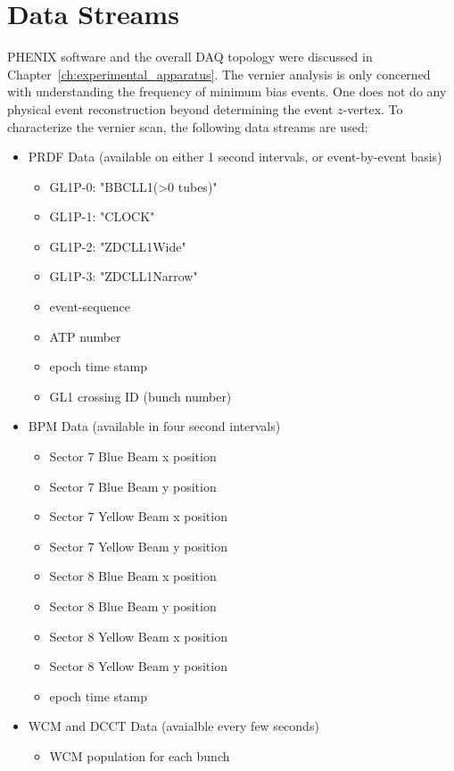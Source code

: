 
\clearpage
\section{Data Streams}
\label{ch:DataStreams}

PHENIX software and the overall DAQ topology were discussed in
Chapter~\ref{ch:experimental_apparatus}. The vernier analysis is only concerned
with understanding the frequency of minimum bias events. One does not do any
physical event reconstruction beyond determining the event $z$-vertex. To
characterize the vernier scan, the following data streams are used:

\begin{itemize}
\item PRDF Data (available on either 1 second intervals, or event-by-event basis)
  \begin{itemize}
  \item GL1P-0: "BBCLL1(\textgreater0 tubes)"
  \item GL1P-1: "CLOCK"
  \item GL1P-2: "ZDCLL1Wide"
  \item GL1P-3: "ZDCLL1Narrow"
  \item event-sequence
  \item ATP number
  \item epoch time stamp
  \item GL1 crossing ID (bunch number)
  \end{itemize}
\item BPM Data (available in four second intervals)
  \begin{itemize}
  \item Sector 7 Blue Beam x position
  \item Sector 7 Blue Beam y position
  \item Sector 7 Yellow Beam x position
  \item Sector 7 Yellow Beam y position
  \item Sector 8 Blue Beam x position
  \item Sector 8 Blue Beam y position
  \item Sector 8 Yellow Beam x position
  \item Sector 8 Yellow Beam y position
  \item epoch time stamp
  \end{itemize}
\item WCM and DCCT Data (avaialble every few seconds)
  \begin{itemize}
  \item WCM population for each bunch

\end{itemize}
\end{itemize}
